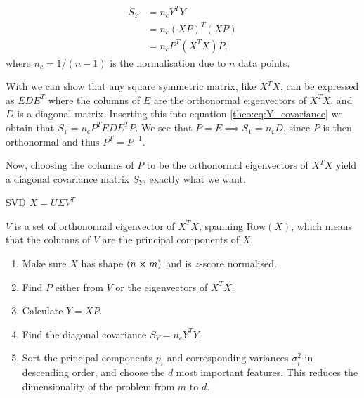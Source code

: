     \begin{align}\label{theo:eq:Y_covariance}
        S_Y &= n_cY^TY\nonumber\\
        &= n_c(XP)^T(XP) \nonumber\\
        &= n_cP^T(X^TX)P,
    \end{align} 
    where $n_c = 1/(n-1)$ is the normalisation due to $n$ data points.

    With \citep[ch. 5.3]{linalgbok} we can show that any square symmetric matrix, like $X^TX$, can be expressed as $EDE^T$ where the columns of $E$ are the orthonormal eigenvectors of $X^TX$, and $D$ is a diagonal matrix. Inserting this into equation  \ref{theo:eq:Y_covariance} we obtain that $S_Y = n_cP^TEDE^TP$. We see that $P=E \implies S_Y=n_c D$\footnotemark, since $P$ is then orthonormal and thus $P^T=P^{-1}$.


    Now, choosing the columns of $P$ to be the orthonormal eigenvectors of $X^TX$ yield a diagonal covariance matrix $S_Y$, exactly what we want. 

    SVD $X=U\Sigma V^T$
    
    $V$ is a set of orthonormal eigenvector of $X^TX$, spanning $\mathrm{Row}(X)$, which means that the columns of $V$ are the principal components of $X$. 
    
    
    \begin{enumerate}
        \item Make sure $X$ has shape $(n\cross m)$ and is $z$-score normalised.
        \item Find $P$ either from $V$ or the eigenvectors of $X^TX$.
        \item Calculate $Y=XP$.
        \item Find the diagonal covariance $S_Y=n_cY^TY$.
        \item Sort the principal components $p_i$ and corresponding variances $\sigma^2_i$ in descending order, and choose the $d$ most important features. This reduces the dimensionality of the problem from $m$ to $d$.
    \end{enumerate}
    
